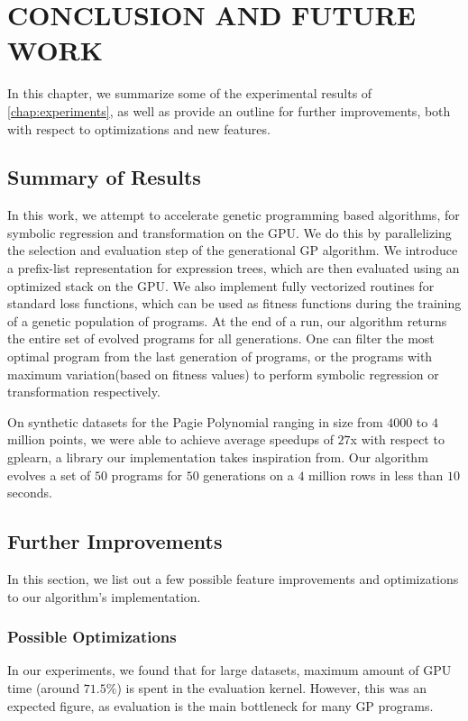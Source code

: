 \chapter{CONCLUSION AND FUTURE WORK}
\label{chap:conclusion}
In this chapter, we summarize some of the experimental results of \cref*{chap:experiments}, as well as provide an outline for further improvements, both with respect to optimizations and new features.

\section{Summary of Results}
\label{sec:summary}
In this work, we attempt to accelerate genetic programming based algorithms, for symbolic regression and transformation on the GPU. We do this by parallelizing the selection and evaluation step of the generational GP algorithm. We introduce a prefix-list representation for expression trees, which are then evaluated using an optimized stack on the GPU. We also implement fully vectorized routines for standard loss functions, which can be used as fitness functions during the training of a genetic population of programs. At the end of a run, our algorithm returns the entire set of evolved programs for all generations. One can filter the most optimal program from the last generation of programs, or the programs with maximum variation(based on fitness values) to perform symbolic regression or transformation respectively. 

On synthetic datasets for the Pagie Polynomial ranging in size from $4000$ to $4$ million points, we were able to achieve average speedups of $27$x with respect to gplearn, a library our implementation takes inspiration from. Our algorithm evolves a set of $50$ programs for $50$ generations on a $4$ million rows in less than $10$ seconds. 

\section{Further Improvements}
\label{sec:improvements}
In this section, we list out a few possible feature improvements and optimizations to our algorithm's implementation.

\subsection{Possible Optimizations}
\label{subsec:optimizations}
In our experiments, we found that for large datasets, maximum amount of GPU time (around $71.5\%$) is spent in the evaluation kernel. However, this was an expected figure, as evaluation is the main bottleneck for many GP programs. 

